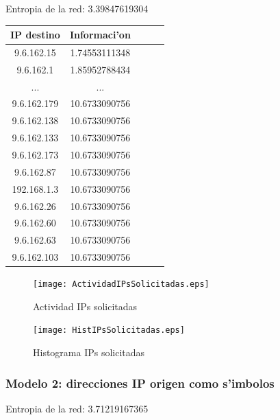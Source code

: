 \documentclass[a4paper,10pt]{article}
\begin{document}
Entropia de la red: 3.39847619304	\\

\noindent \begin{tabular}{| c | c | c | c | r} \hline
IP destino	&	Informaci'on	\\	\hline
9.6.162.15	 & 	1.74553111348	 \\ \hline 
9.6.162.1	 & 	1.85952788434	 \\ \hline 
...	&	...	\\ \hline
9.6.162.179	 & 	10.6733090756	 \\ \hline 
9.6.162.138	 & 	10.6733090756	 \\ \hline 
9.6.162.133	 & 	10.6733090756	 \\ \hline 
9.6.162.173	 & 	10.6733090756	 \\ \hline 
9.6.162.87	 & 	10.6733090756	 \\ \hline 
192.168.1.3	 & 	10.6733090756	 \\ \hline 
9.6.162.26	 & 	10.6733090756	 \\ \hline 
9.6.162.60	 & 	10.6733090756	 \\ \hline 
9.6.162.63	 & 	10.6733090756	 \\ \hline 
9.6.162.103	 & 	10.6733090756	 \\ \hline 
\end{tabular}

\newpage

\begin{figure}[!hbp]
\begin{center}
\texttt{[image: ActividadIPsSolicitadas.eps]}
\end{center}
\caption{Actividad IPs solicitadas} \label{figura2}
\end{figure}

\begin{figure}[!hbp]
\begin{center}
\texttt{[image: HistIPsSolicitadas.eps]}
\end{center}
\caption{Histograma IPs solicitadas} \label{figura3}
\end{figure}

\newpage

\subsubsection{Modelo 2: direcciones IP origen como s'imbolos}

Entropia de la red: 3.71219167365	\\
\end{document}
